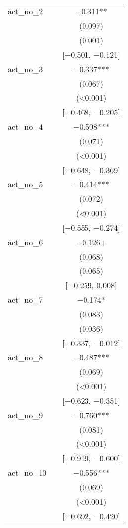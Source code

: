 \documentclass[
]{article}
\begin{document}
\begin{table}[H]
\begin{tabular}[t]{lcc}
act\_no\_2 &  & \num{-0.311}**\\
 &  & (\num{0.097})\\
 &  & (\num{0.001})\\
 &  & {}[\num{-0.501}, \num{-0.121}]\\
act\_no\_3 &  & \num{-0.337}***\\
 &  & (\num{0.067})\\
 &  & \vphantom{15} (\num{<0.001})\\
 &  & {}[\num{-0.468}, \num{-0.205}]\\
act\_no\_4 &  & \num{-0.508}***\\
 &  & \vphantom{1} (\num{0.071})\\
 &  & \vphantom{14} (\num{<0.001})\\
 &  & {}[\num{-0.648}, \num{-0.369}]\\
act\_no\_5 &  & \num{-0.414}***\\
 &  & (\num{0.072})\\
 &  & \vphantom{13} (\num{<0.001})\\
 &  & {}[\num{-0.555}, \num{-0.274}]\\
act\_no\_6 &  & \num{-0.126}+\\
 &  & (\num{0.068})\\
 &  & (\num{0.065})\\
 &  & {}[\num{-0.259}, \num{0.008}]\\
act\_no\_7 &  & \num{-0.174}*\\
 &  & (\num{0.083})\\
 &  & (\num{0.036})\\
 &  & {}[\num{-0.337}, \num{-0.012}]\\
act\_no\_8 &  & \num{-0.487}***\\
 &  & \vphantom{1} (\num{0.069})\\
 &  & \vphantom{12} (\num{<0.001})\\
 &  & {}[\num{-0.623}, \num{-0.351}]\\
act\_no\_9 &  & \num{-0.760}***\\
 &  & \vphantom{1} (\num{0.081})\\
 &  & \vphantom{11} (\num{<0.001})\\
 &  & {}[\num{-0.919}, \num{-0.600}]\\
act\_no\_10 &  & \num{-0.556}***\\
 &  & (\num{0.069})\\
 &  & \vphantom{10} (\num{<0.001})\\
 &  & {}[\num{-0.692}, \num{-0.420}]\\

\end{tabular}
\end{table}
\end{document}
